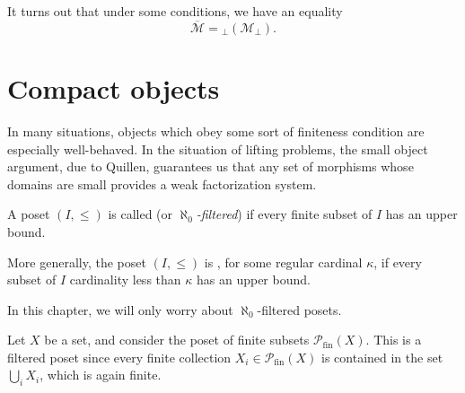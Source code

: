 \documentclass[main.tex]{subfiles}
\begin{document}
It turns out that under some conditions, we have an equality
\begin{equation*}
  \overline{\mathcal{M}} = {}_{\perp}(\mathcal{M}_{\perp}).
\end{equation*}

\section{Compact objects}
\label{sec:compact_objects}

In many situations, objects which obey some sort of finiteness condition are especially well-behaved. In the situation of lifting problems, the small object argument, due to Quillen, guarantees us that any set of morphisms whose domains are small provides a weak factorization system.

\begin{definition}
  \label{def:filtered_poset}
  A poset $(I, \leq)$ is called  (or \emph{$\aleph_{0}$-filtered}) if every finite subset of $I$ has an upper bound. 

  More generally, the poset $(I, \leq)$ is , for some regular cardinal $\kappa$, if every subset of $I$ cardinality less than $\kappa$ has an upper bound.
\end{definition}

In this chapter, we will only worry about $\aleph_{0}$-filtered posets.

\begin{example}
  \label{eg:poset_of_finite_subsets}
  Let $X$ be a set, and consider the poset of finite subsets $\mathcal{P}_{\mathrm{fin}}(X)$. This is a filtered poset since every finite collection $X_{i} \in \mathcal{P}_{\mathrm{fin}}(X)$ is contained in the set $\bigcup_{i} X_{i}$, which is again finite.
\end{example}
\end{document}
